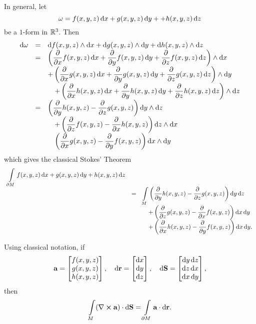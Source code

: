 In general, let $$ \omega = f(x,y,z)\d{x} + g(x,y,z)\d{y} ++
h(x,y,z)\d{z}  $$ be a $1$-form in $\mathbb{R} ^3$. Then
 $$\begin{array}{lll} \d{\omega}  & =  & \d{f(x,y,z)}\wedge\d{x} + \d{g(x,y,z)}\wedge\d{y}+ \d{h(x,y,z)}\wedge\d{z} \\
 &=& \left(\dfrac{\partial }{\partial x}f(x,y,z)\d{x}+ \dfrac{\partial }{\partial y}f(x,y,z)\d{y}+ \dfrac{\partial }{\partial
 z}f(x,y,z)\d{z}\right)\wedge\d{x} \\ & &
 +  \left(\dfrac{\partial }{\partial x}g(x,y,z)\d{x}+ \dfrac{\partial }{\partial
 y}g(x,y,z)\d{y} +\dfrac{\partial }{\partial z}g(x,y,z)\d{z}\right)\wedge\d{y}\\
 & & \quad +  \left(\dfrac{\partial }{\partial x}h(x,y,z)\d{x}+ \dfrac{\partial }{\partial
 y}h(x,y,z)\d{y} +\dfrac{\partial }{\partial z}h(x,y,z)\d{z}\right)\wedge\d{z}\\
 & = &
 \left(\dfrac{\partial }{\partial y}h(x,y,z)- \dfrac{\partial }{\partial
 z}g(x,y,z)\right)\d{y}\wedge\d{z} \\
 & & \quad + \left(\dfrac{\partial }{\partial z}f(x,y,z)- \dfrac{\partial }{\partial
 x}h(x,y,z)\right)\d{z}\wedge\d{x}\\
 & & \quad
  \left(\dfrac{\partial }{\partial x}g(x,y,z)- \dfrac{\partial }{\partial y}f(x,y,z)\right)\d{x}\wedge\d{y}
 \end{array}$$
which gives the classical Stokes' Theorem
$$ \begin{array}{lll} \dint \limits _{\partial M}  f(x,y,z)\d{x} + g(x,y,z)\d{y}+h(x,y,z)\d{z} \\
 & = & \dint \limits _M   \left(\dfrac{\partial }{\partial y}h(x,y,z)- \dfrac{\partial }{\partial
z}g(x,y,z)\right)\d{y}\d{z}\\
& & \quad + \left(\dfrac{\partial }{\partial z}g(x,y,z)-
\dfrac{\partial
}{\partial x}f(x,y,z)\right)\d{x}\d{y} \\
& & \quad + \left(\dfrac{\partial }{\partial x}h(x,y,z)-
\dfrac{\partial }{\partial y}f(x,y,z)\right)\d{x}\d{y}
.\end{array}$$

Using classical notation, if
$$\vector{a}=\colvec{f(x,y,z)\\ g(x,y,z)\\ h(x,y,z)}, \quad \d{\vector{r}}=\colvec{\d{x}\\ \d{y}\\ \d{z}},\quad  \d{\vector{S}} = \colvec{\d{y}\d{z}\\ \d{z}\d{x}\\ \d{x}\d{y}}, $$
then
$$\dint  \limits _{ M}  (\nabla \cross \vector{a} )\cdot \d{\vector{S}} = \dint \limits _{\partial M} \vector{a} \cdot \d{\vector{r}}.  $$






